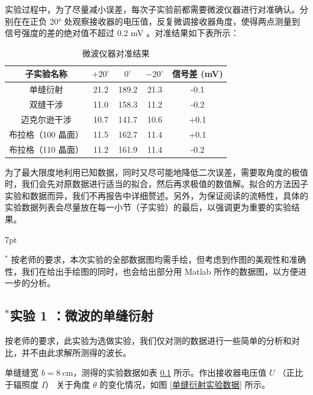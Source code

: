 \documentclass[UTF8]{article}
\theoremstyle{MyLineTheoremStyle} %
\theoremstyle{MyBlockTheoremStyle} %
\theoremstyle{MySubsubsectionStyle} %
\newenvironment{graybox}{%
        \def\FrameCommand{%
        \hspace{1pt}%
        {\color{gray}\vrule width 2pt}%
        {\color{graybox_color}\vrule width 4pt}%
        \colorbox{graybox_color}%
        }%
        \MakeFramed{\advance\hsize-\width\FrameRestore}%
        \noindent\hspace{-4.55pt}%
        \begin{adjustwidth}{}{7pt}%
        \vspace{2pt}\vspace{2pt}%
        }
        {%
        \vspace{2pt}\end{adjustwidth}\endMakeFramed%
        }
\begin{document}
实验过程中，为了尽量减小误差，每次子实验前都需要微波仪器进行对准确认。分别在在正负 20° 处观察接收器的电压值，反复微调接收器角度，使得两点测量到信号强度的差的绝对值不超过 0.2 mV 。对准结果如下表所示：
\begin{table}[H]\centering
    \caption{微波仪器对准结果}
    \label{微波仪器对准结果}
    \begin{tabular}{ccccc}
        \toprule
            子实验名称 & $+20^\circ$ & $0^\circ$ & $-20^\circ$ & 信号差 (mV) \\
            \midrule
            单缝衍射 & 21.2 & 189.2 & 21.3 & -0.1 \\ 
            双缝干涉 & 11.0 & 158.3 & 11.2 & -0.2 \\ 
            迈克尔逊干涉 & 10.7 & 141.7 & 10.6 & +0.1 \\ 
            布拉格（100 晶面） & 11.5 & 162.7 & 11.4 & +0.1 \\ 
            布拉格（110 晶面） & 11.2 & 161.9 & 11.4 & -0.2 \\ 
            \bottomrule
        \end{tabular}
\end{table}

为了最大限度地利用已知数据，同时又尽可能地降低二次误差，需要取角度的极值时，我们会先对原数据进行适当的拟合，然后再求极值的数值解。拟合的方法因子实验和数据而异，我们不再报告中详细赘述。另外，为保证阅读的流畅性，具体的实验数据列表会尽量放在每一小节（子实验）的最后，以强调更为重要的实验结果。

\begin{graybox}
    $^*$ 按老师的要求，本次实验的全部数据图均需手绘，但考虑到作图的美观性和准确性，我们在给出手绘图的同时，也会给出部分用 Matlab 所作的数据图，以方便进一步的分析。
\end{graybox}


\subsection{$^*$实验 1 ：微波的单缝衍射}
按老师的要求，此实验为选做实验，我们仅对测的数据进行一些简单的分析和对比，并不由此求解所测得的波长。

单缝缝宽 $b = 8 \ \mathrm{cm}$，测得的实验数据如表 \ref{} 所示。作出接收器电压值 $U$ （正比于辐照度 $I$） 关于角度 $\theta$ 的变化情况，如图 \ref{单缝衍射实验数据} 所示。
\end{document}
